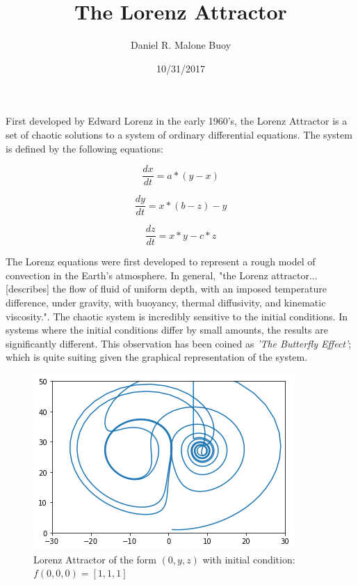 \documentclass{article}
\author{Daniel R. Malone Buoy}
\title{The Lorenz Attractor}
\date{10/31/2017}
\begin{document}
\maketitle
First developed by Edward Lorenz in the early 1960's, the Lorenz Attractor is a set of chaotic solutions to a system of ordinary differential equations.  The system is defined by the following equations\cite{sparrow1982lorenz_equations}:

\begin{equation}
\frac{dx}{dt} = a*(y-x) 
\end{equation}

\begin{equation}
\frac{dy}{dt} = x*(b-z)-y
\end{equation}

\begin{equation}
\frac{dz}{dt} = x*y - c*z
\end{equation}

The Lorenz equations were first developed to represent a rough model of convection in the Earth's atmosphere\cite{tucker1999lorenz}.  In general, "the Lorenz attractor... [describes] the flow of fluid of uniform depth, with an imposed temperature difference, under gravity, with buoyancy, thermal diffusivity, and kinematic viscosity."\cite{tabor1989chaos}.  The chaotic system is incredibly sensitive to the initial conditions.  In systems where the initial conditions differ by small amounts, the results are significantly different.  This observation has been coined as \emph{'The Butterfly Effect'}\cite{dizikes2011butterfly_effect}; which is quite suiting given the graphical representation of the system.

\begin{figure}[h!]
\centering
\includegraphics[width=.75\textwidth]{lorenz_Attractor}
\caption{Lorenz Attractor of the form $(0,y,z)$ with initial condition: $f(0,0,0)=[1,1,1]$}
\label{fig:lorenz}
\end{figure}
\end{document}
